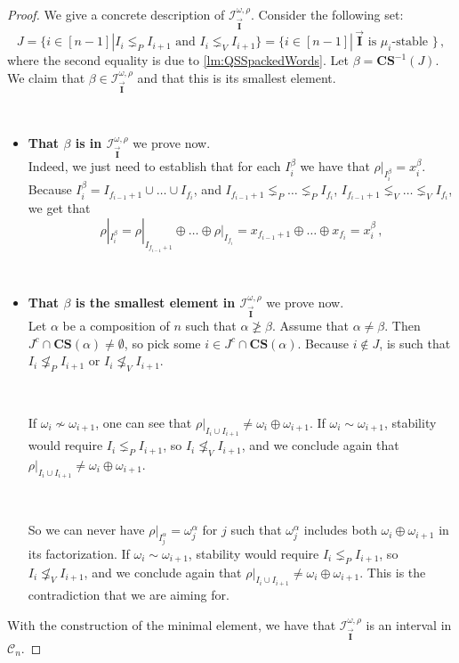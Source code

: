 \documentclass[12pt, reqno]{amsart}
\theoremstyle{definition}
\newcommand{\III}{\vec{\mathbf{I}}}
\begin{document}
\begin{proof}
We give a concrete description of $\mathcal I^{\omega, \rho}_{\III}$.
Consider the following set:
$$J = \{i \in [n-1] | I_i \lneq_P I_{i+1} \text{ and } I_i \lneq_V I_{i+1} \} = \{i \in [n-1] | \, \III \text{ is $\mu_i$-stable } \} \, ,$$
where the second equality is due to \cref{lm:QSSpackedWords}.
Let $\beta = \mathbf{CS}^{-1}( J)$. 
We claim that $\beta \in \mathcal I^{\omega, \rho}_{\III}$ and that this is its smallest element.

\
\begin{itemize}
\item {\bf That $\beta$ is in $\mathcal I^{\omega, \rho}_{\III}$} we prove now.\\
Indeed, we just need to establish that for each $I^{\beta}_i$ we have that $\rho|_{I^{\beta}_i} = x^{\beta}_i$.
Because $I^{\beta}_i = I_{f_{i-1} + 1} \cup \dots \cup I_{f_i}$, and $I_{f_{i-1} + 1} \lneq_P \dots \lneq_P I_{f_i}$, $I_{f_{i-1} + 1} \lneq_V \dots \lneq_V I_{f_i}$, we get that 
$$\rho|_{I^{\beta}_i} = \rho|_{I_{f_{i-1} + 1}} \oplus \dots \oplus \rho|_{I_{f_i}} = x_{f_{i-1} + 1} \oplus \dots\oplus x_{f_i} = x^{\beta}_i\,  ,$$

\

    \item {\bf That $\beta$ is the smallest element in $\mathcal I^{\omega, \rho}_{\III}$} we prove now. \\
Let $\alpha $ be a composition of $n$ such that $\alpha \not \geq \beta$.
Assume that $\alpha \neq \beta$. 
Then $J^c \cap \mathbf{CS}(\alpha)\neq \emptyset $, so pick some $i \in  J^c \cap \mathbf{CS}(\alpha) $.
Because $i \not\in J$, is such that $ I_i \not\lneq_P I_{i+1} \text{ or } I_i \not\lneq_V I_{i+1} $.

\

If $\omega_i \not\sim \omega_{i+1}$, one can see that $\rho|_{I_i \cup I_{i+1}} \neq \omega_i \oplus \omega_{i+1}$.
If $\omega_i \sim \omega_{i+1}$, stability would require $I_i \lneq_P I_{i+1}$, so $I_i \not\lneq_V I_{i+1}$, and we conclude again that $\rho|_{I_i \cup I_{i+1}} \neq \omega_i \oplus \omega_{i+1}$.

\

So we can never have $\rho|_{I^{\alpha}_j} = \omega^{\alpha}_j$ for $j$ such that $\omega^{\alpha}_j$ includes both $\omega_i \oplus \omega_{i+1}$ in its factorization.
If $\omega_i \sim \omega_{i+1}$, stability would require $I_i \lneq_P I_{i+1}$, so $I_i \not\lneq_V I_{i+1}$, and we conclude again that $\rho|_{I_i \cup I_{i+1}} \neq \omega_i \oplus \omega_{i+1}$.
This is the contradiction that we are aiming for.
\end{itemize}
With the construction of the minimal element, we have that $\mathcal I^{\omega, \rho}_{\III}$ is an interval in $\mathcal{C}_n$.
\end{proof}
\end{document}
